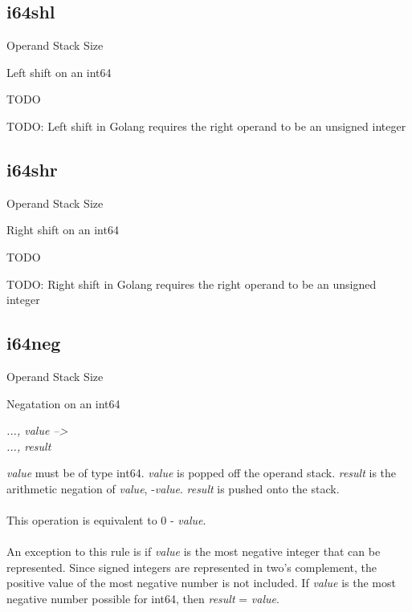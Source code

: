 \documentclass[12pt]{article}
\begin{document}
		\newpage
		\subsection*{i64shl}
			\begin{labeling}{Operand Stack Size}
				\item [\textbf{Operation}] Left shift on an int64
				\item [\textbf{Format}] 
				\item [\textbf{Operand Stack}] TODO
				\item [\textbf{Description}] TODO: Left shift in Golang requires the right operand to be an unsigned integer
			\end{labeling}	
			
		\newpage
		\subsection*{i64shr}
			\begin{labeling}{Operand Stack Size}
				\item [\textbf{Operation}] Right shift on an int64
				\item [\textbf{Format}] 
				\item [\textbf{Operand Stack}] TODO
				\item [\textbf{Description}] TODO: Right shift in Golang requires the right operand to be an unsigned integer
			\end{labeling}	
			
		\newpage
		\subsection*{i64neg}
			\begin{labeling}{Operand Stack Size}
				\item [\textbf{Operation}] Negatation on an int64
				\item [\textbf{Format}] 
				\item [\textbf{Operand Stack}] \textit{..., value --\textgreater} \\
										\textit{..., result}
				\item [\textbf{Description}] \textit{value} must be of type int64. \textit{value} is popped off the operand stack. \textit{result} is the arithmetic negation of \textit{value}, -\textit{value}. \textit{result} is pushed onto the stack. \\ \\
				This operation is equivalent to 0 - \textit{value}. \\ \\
				An exception to this rule is if \textit{value} is the most negative integer that can be represented. Since signed integers are represented in two's complement, the positive value of the most negative number is not included. If \textit{value} is the most negative number possible for int64, then \textit{result} = \textit{value}.
			\end{labeling}	
			
\end{document}
